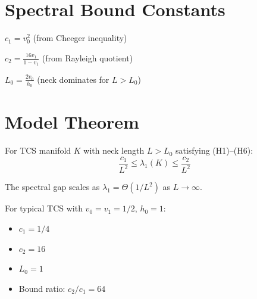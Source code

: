 \section{Spectral Bound Constants}

\begin{definition}\label{def:c1}
    \leanok
    $c_1 = v_0^2$ (from Cheeger inequality)
\end{definition}

\begin{definition}\label{def:c2}
    \leanok
    $c_2 = \frac{16 v_1}{1 - v_1}$ (from Rayleigh quotient)
\end{definition}

\begin{definition}\label{def:L0}
    \leanok
    $L_0 = \frac{2 v_0}{h_0}$ (neck dominates for $L > L_0$)
\end{definition}

\section{Model Theorem}

\begin{theorem}\label{thm:tcs_spectral_bounds}
    \leanok
    For TCS manifold $K$ with neck length $L > L_0$ satisfying (H1)--(H6):
    \[
        \frac{c_1}{L^2} \leq \lambda_1(K) \leq \frac{c_2}{L^2}
    \]
\end{theorem}

\begin{theorem}\label{thm:inverse_L_squared}
    \leanok
    The spectral gap scales as $\lambda_1 = \Theta(1/L^2)$ as $L \to \infty$.
\end{theorem}

\begin{theorem}\label{thm:typical_tcs}
    \leanok
    For typical TCS with $v_0 = v_1 = 1/2$, $h_0 = 1$:
    \begin{itemize}
        \item $c_1 = 1/4$
        \item $c_2 = 16$
        \item $L_0 = 1$
        \item Bound ratio: $c_2/c_1 = 64$
    \end{itemize}
\end{theorem}

